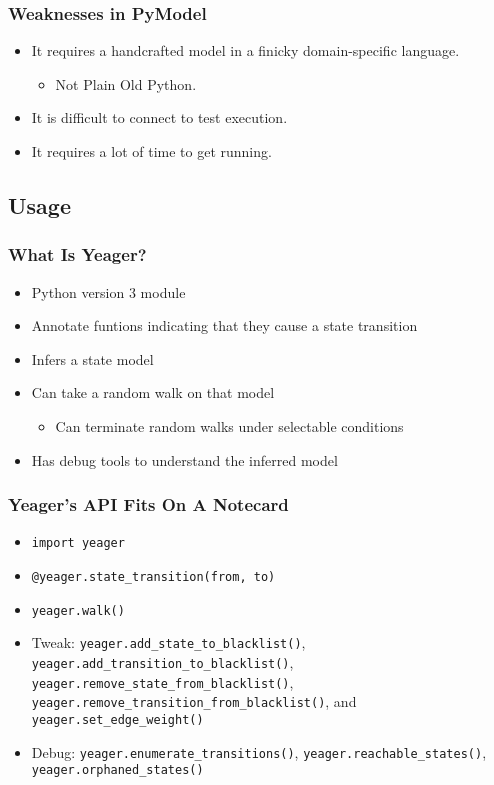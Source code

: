 \begin{frame}
  \frametitle{Weaknesses in PyModel}
  \begin{itemize}
    \item It requires a handcrafted model in a finicky domain-specific language.
    \begin{itemize}
      \item Not Plain Old Python.
    \end{itemize}
    \item It is difficult to connect to test execution.
    \item It requires a lot of time to get running.
  \end{itemize}
\end{frame}

\subsection{Usage}

\begin{frame}
  \frametitle{What Is Yeager?}
  \begin{itemize}
    \item Python version 3 module
    \item Annotate funtions indicating that they cause a state transition
    \item Infers a state model
    \item Can take a random walk on that model
    \begin{itemize}
      \item Can terminate random walks under selectable conditions
    \end{itemize}
    \item Has debug tools to understand the inferred model
  \end{itemize}
\end{frame}

\begin{frame}
  \frametitle{Yeager's API Fits On A Notecard}
  \begin{itemize}
    \item \texttt{import yeager}
    \item \texttt{@yeager.state\_transition(from, to)}
    \item \texttt{yeager.walk()}
    \item Tweak: \texttt{yeager.add\_state\_to\_blacklist()}, \texttt{yeager.add\_transition\_to\_blacklist()}, \texttt{yeager.remove\_state\_from\_blacklist()}, \texttt{yeager.remove\_transition\_from\_blacklist()}, and \texttt{yeager.set\_edge\_weight()}
    \item Debug: \texttt{yeager.enumerate\_transitions()}, \texttt{yeager.reachable\_states()}, \texttt{yeager.orphaned\_states()}
  \end{itemize}
\end{frame}

